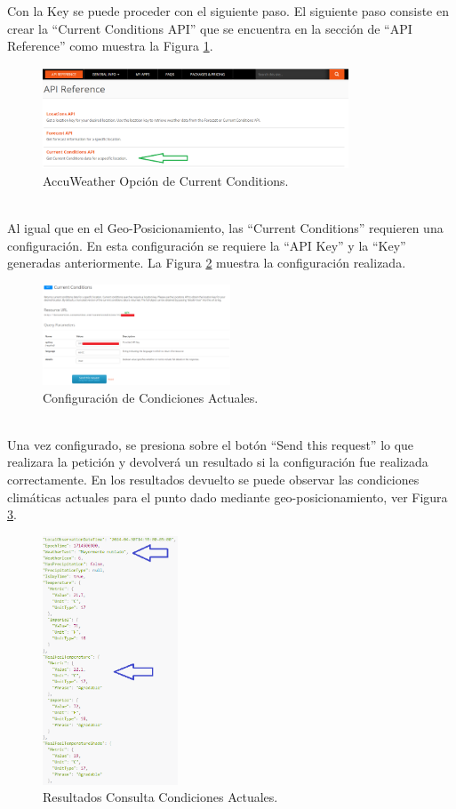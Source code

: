 \documentclass[a4paper,10pt, oneside, titlepage]{article}
\begin{document}
	\indent Con la Key se puede proceder con el siguiente paso. El siguiente paso consiste en crear la ``Current Conditions API'' que se encuentra en la sección de ``API Reference'' como muestra la Figura \ref{Current_Conditions_API_AccuWeather}.
	\begin{figure}[!h]
		\centering
		\includegraphics[width = 1\linewidth, height = 3cm]{Current_Conditions_API_AccuWeather.png}
		\caption{AccuWeather Opción de Current Conditions.}
		\label{Current_Conditions_API_AccuWeather}
	\end{figure} \\
	\indent Al igual que en el Geo-Posicionamiento, las ``Current Conditions'' requieren una configuración. En esta configuración se requiere la ``API Key''  y la ``Key'' generadas anteriormente. La Figura \ref{AccuWeather_Current_Conditions_Configuracion} muestra la configuración realizada.
	\begin{figure}[!h]
		\centering
		\includegraphics[width = 1\linewidth, height = 3cm]{AccuWeather_Current_Conditions_Configuracion.png}
		\caption{Configuración de Condiciones Actuales.}
		\label{AccuWeather_Current_Conditions_Configuracion}
	\end{figure} \\
	\indent Una vez configurado, se presiona sobre el botón ``Send this request'' lo que realizara la petición y devolverá un resultado si la configuración fue realizada correctamente. En los resultados devuelto se puede observar las condiciones climáticas actuales para el punto dado mediante geo-posicionamiento, ver Figura \ref{Resultados_Query_Current_AccuWeather}.
	\begin{figure}[!h]
		\centering
		\includegraphics[width = 0.65\linewidth, height = 7.4cm]{Resultados_Query_Current_AccuWeather.png}
		\caption{Resultados Consulta Condiciones Actuales.}
		\label{Resultados_Query_Current_AccuWeather}
	\end{figure} 
	
\end{document}
